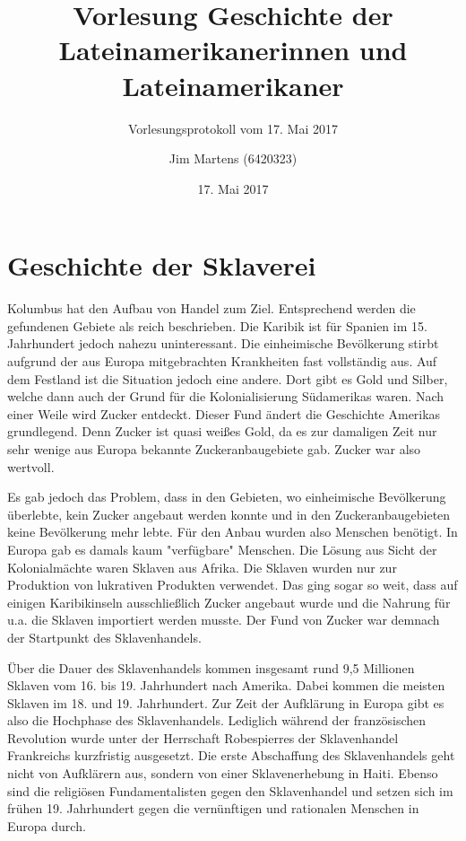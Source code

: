 \documentclass[10pt,a4paper,oneside,ngerman,numbers=noenddot]{scrartcl}
\begin{document}
\author{Jim Martens (6420323)}
\title{Vorlesung Geschichte der Lateinamerikanerinnen und Lateinamerikaner}
\subtitle{Vorlesungsprotokoll vom 17. Mai 2017}
\date{17. Mai 2017}
\maketitle

\section*{Geschichte der Sklaverei}

Kolumbus hat den Aufbau von Handel zum Ziel. Entsprechend werden die gefundenen
Gebiete als reich beschrieben. Die Karibik ist für Spanien im 15. Jahrhundert
jedoch nahezu uninteressant. Die einheimische Bevölkerung stirbt aufgrund der
aus Europa mitgebrachten Krankheiten fast vollständig aus. Auf dem Festland
ist die Situation jedoch eine andere. Dort gibt es Gold und Silber, welche
dann auch der Grund für die Kolonialisierung Südamerikas waren. Nach einer Weile
wird Zucker entdeckt. Dieser Fund ändert die Geschichte Amerikas grundlegend.
Denn Zucker ist quasi weißes Gold, da es zur damaligen Zeit nur sehr wenige
aus Europa bekannte Zuckeranbaugebiete gab. Zucker war also wertvoll.

Es gab jedoch das Problem, dass in den Gebieten, wo einheimische Bevölkerung
überlebte, kein Zucker angebaut werden konnte und in den Zuckeranbaugebieten
keine Bevölkerung mehr lebte. Für den Anbau wurden also Menschen benötigt. In
Europa gab es damals kaum "verfügbare" Menschen. Die Lösung aus Sicht der
Kolonialmächte waren Sklaven aus Afrika. Die Sklaven wurden nur zur Produktion
von lukrativen Produkten verwendet. Das ging sogar so weit, dass auf einigen
Karibikinseln ausschließlich Zucker angebaut wurde und die Nahrung für u.a. die
Sklaven importiert werden musste. Der Fund von Zucker war demnach der Startpunkt
des Sklavenhandels.

Über die Dauer des Sklavenhandels kommen insgesamt rund 9,5 Millionen Sklaven
vom 16. bis 19. Jahrhundert nach Amerika. Dabei kommen die meisten Sklaven im
18. und 19. Jahrhundert. Zur Zeit der Aufklärung in Europa gibt es also die
Hochphase des Sklavenhandels. Lediglich während der französischen Revolution
wurde unter der Herrschaft Robespierres der Sklavenhandel Frankreichs kurzfristig
ausgesetzt. Die erste Abschaffung des Sklavenhandels geht nicht von Aufklärern aus,
sondern von einer Sklavenerhebung in Haiti. Ebenso sind die religiösen
Fundamentalisten gegen den Sklavenhandel und setzen sich im frühen 19. Jahrhundert
gegen die vernünftigen und rationalen Menschen in Europa durch.
\end{document}

